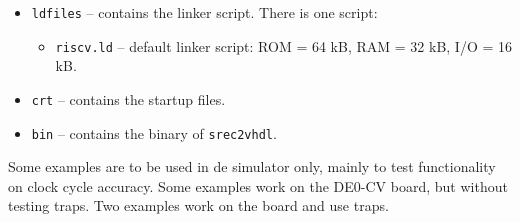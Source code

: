\documentclass[12pt]{article}
\begin{document}
\begin{itemize}
\item \texttt{ldfiles} -- contains the linker script. There is one script:
\begin{itemize}
\item \texttt{riscv.ld} -- default linker script: ROM = 64 kB, RAM = 32 kB, I/O = 16 kB.
\end{itemize}
\item \texttt{crt} -- contains the startup files.
\item \texttt{bin} -- contains the binary of \texttt{srec2vhdl}.
\end{itemize}

Some examples are to be used in de simulator only, mainly to test functionality on clock cycle accuracy. Some examples work on the DE0-CV board, but without testing traps. Two examples work on the board and use traps.
\end{document}
